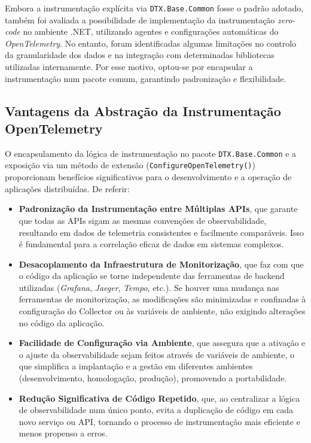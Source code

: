 Embora a instrumentação explícita via \texttt{DTX.Base.Common} fosse o padrão adotado, também foi avaliada a possibilidade de implementação da instrumentação \textit{zero-code} no ambiente .NET, utilizando agentes e configurações automáticas do \textit{OpenTelemetry}. No entanto, foram identificadas algumas limitações no controlo da granularidade dos dados e na integração com determinadas bibliotecas utilizadas internamente. Por esse motivo, optou-se por encapsular a instrumentação num pacote comum, garantindo padronização e flexibilidade.


\subsection{Vantagens da Abstração da Instrumentação OpenTelemetry}

O encapsulamento da lógica de instrumentação no pacote \texttt{DTX.Base.Common} e a exposição via um método de extensão (\texttt{ConfigureOpenTelemetry()}) proporcionam benefícios significativos para o desenvolvimento e a operação de aplicações distribuídas. De referir:

\begin{itemize}
\item \textbf{Padronização da Instrumentação entre Múltiplas APIs}, que garante que todas as APIs sigam as mesmas convenções de observabilidade, resultando em dados de telemetria consistentes e facilmente comparáveis. Isso é fundamental para a correlação eficaz de dados em sistemas complexos.

\item \textbf{Desacoplamento da Infraestrutura de Monitorização}, que faz com que o código da aplicação se torne independente das ferramentas de backend utilizadas (\textit{Grafana}, \textit{Jaeger}, \textit{Tempo}, etc.). Se houver uma mudança nas ferramentas de monitorização, as modificações são minimizadas e confinadas à configuração do Collector ou às variáveis de ambiente, não exigindo alterações no código da aplicação.

\item \textbf{Facilidade de Configuração via Ambiente}, que assegura que a ativação e o ajuste da observabilidade sejam feitos através de variáveis de ambiente, o que simplifica a implantação e a gestão em diferentes ambientes (desenvolvimento, homologação, produção), promovendo a portabilidade.

\item \textbf{Redução Significativa de Código Repetido}, que, ao centralizar a lógica de observabilidade num único ponto, evita a duplicação de código em cada novo serviço ou API, tornando o processo de instrumentação mais eficiente e menos propenso a erros.
\end{itemize}

